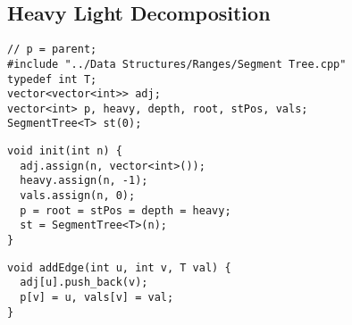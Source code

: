\documentclass[twoside]{article}
\begin{document}
\begin{multicols*}{2}
\subsectionfont{\large\bfseries\sffamily\underline}
\subsection*{Heavy Light Decomposition}
\begin{verbatim}
// p = parent;
#include "../Data Structures/Ranges/Segment Tree.cpp"
typedef int T;
vector<vector<int>> adj;
vector<int> p, heavy, depth, root, stPos, vals;
SegmentTree<T> st(0);
\end{verbatim}
\vspace{-12pt}
\begin{verbatim}
void init(int n) {
  adj.assign(n, vector<int>());
  heavy.assign(n, -1);
  vals.assign(n, 0);
  p = root = stPos = depth = heavy;
  st = SegmentTree<T>(n);
}
\end{verbatim}
\vspace{-12pt}
\begin{verbatim}
void addEdge(int u, int v, T val) {
  adj[u].push_back(v);
  p[v] = u, vals[v] = val;
}


\end{verbatim}
\end{multicols*}
\end{document}
